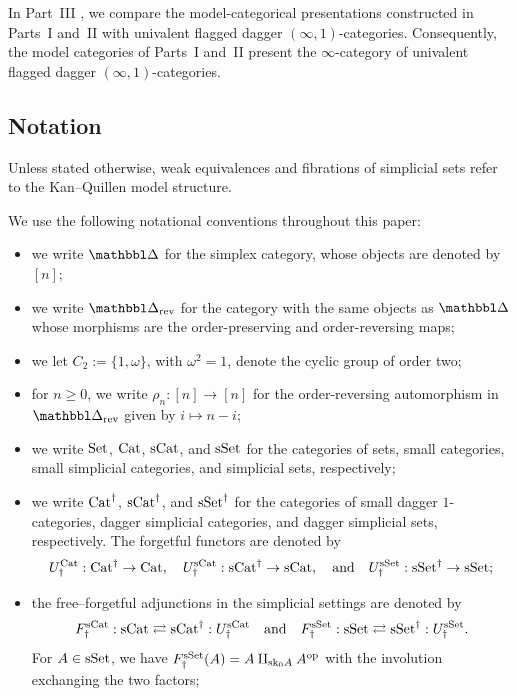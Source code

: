 \documentclass[a4paper,dvipdfmx,11pt]{amsart}
\begin{document}
In Part~III \cite{Aka26-3}, we compare the model-categorical presentations constructed in Parts~I and~II with univalent flagged dagger $(\infty,1)$-categories.
Consequently, the model categories of Parts~I and~II present the $\infty$-category of univalent flagged dagger $(\infty,1)$-categories.

\subsection*{Notation}

Unless stated otherwise, weak equivalences and fibrations of simplicial sets refer to the Kan--Quillen model structure.

We use the following notational conventions throughout this paper:
\begin{itemize}
  \item we write $\prism$ for the simplex category, whose objects are denoted by $[n]$;
  \item we write $\prism_{\rev}$ for the category with the same objects as $\prism$ whose morphisms are the order-preserving and order-reversing maps;
  \item we let $C_2:=\{1,\omega\}$, with $\omega^2=1$, denote the cyclic group of order two;
  \item for $n\geq0$, we write $\rho_n:[n]\to[n]$ for the order-reversing automorphism in $\prism_{\rev}$ given by $i\mapsto n-i$;
  \item we write $\mathrm{Set}$, $\mathrm{Cat}$, $\mathrm{sCat}$, and $\mathrm{sSet}$ for the categories of sets, small categories, small simplicial categories, and simplicial sets, respectively;
  \item we write $\mathrm{Cat}^{\dag}$, $\mathrm{sCat}^{\dag}$, and $\mathrm{sSet}^{\dag}$ for the categories of small dagger $1$-categories, dagger simplicial categories, and dagger simplicial sets, respectively.
  The forgetful functors are denoted by 
  \begin{align}
    U_{\dag}^{\mathrm{Cat}}:\mathrm{Cat}^{\dag}\to\mathrm{Cat}, 
    \quad
    U_{\dag}^{\mathrm{sCat}}:\mathrm{sCat}^{\dag}\to\mathrm{sCat},
    \quad \text{and} \quad
    U_{\dag}^{\mathrm{sSet}}:\mathrm{sSet}^{\dag}\to\mathrm{sSet};
  \end{align}
  \item the free--forgetful adjunctions in the simplicial settings are denoted by 
  \begin{align}
    F_{\dag}^{\mathrm{sCat}}:\mathrm{sCat} \rightleftarrows \mathrm{sCat}^{\dag}:U_{\dag}^{\mathrm{sCat}}
    \quad \text{and} \quad
    F_{\dag}^{\mathrm{sSet}}:\mathrm{sSet} \rightleftarrows \mathrm{sSet}^{\dag}:U_{\dag}^{\mathrm{sSet}}.
  \end{align}
  For $A\in\mathrm{sSet}$, we have $F_{\dag}^{\mathrm{sSet}}(A)=A\amalg_{\mathrm{sk}_0A}A^{\operatorname{op}}$ with the involution exchanging the two factors;

\end{itemize}
\end{document}

